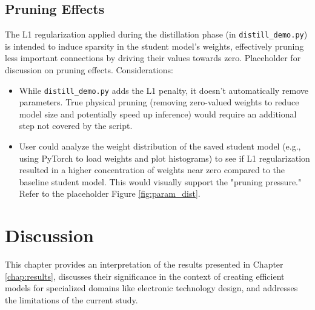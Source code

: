 \documentclass[12pt, a4paper]{report}
\begin{document}
\section{Pruning Effects}
\label{sec:pruning_effects}
The L1 regularization applied during the distillation phase (in \texttt{distill\_demo.py}) is intended to induce sparsity in the student model's weights, effectively pruning less important connections by driving their values towards zero.
\noindent Placeholder for discussion on pruning effects. Considerations:
\begin{itemize}
    \item While \texttt{distill\_demo.py} adds the L1 penalty, it doesn't automatically remove parameters. True physical pruning (removing zero-valued weights to reduce model size and potentially speed up inference) would require an additional step not covered by the script.
    \item User could analyze the weight distribution of the saved student model (e.g., using PyTorch to load weights and plot histograms) to see if L1 regularization resulted in a higher concentration of weights near zero compared to the baseline student model. This would visually support the "pruning pressure." Refer to the placeholder Figure \ref{fig:param_dist}.
\end{itemize}

\chapter{Discussion}
\label{chap:discussion}
This chapter provides an interpretation of the results presented in Chapter \ref{chap:results}, discusses their significance in the context of creating efficient models for specialized domains like electronic technology design, and addresses the limitations of the current study.
\end{document}
